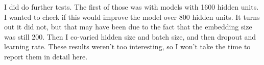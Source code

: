 \documentclass{article}
\begin{document}
I did do further tests. The first of those was with models with 1600 hidden units. I wanted to check if this would improve the model over 800 hidden units. It turns out it did not, but that may have been due to the fact that the embedding size was still 200. Then I co-varied hidden size and batch size, and then dropout and learning rate. These results weren't too interesting, so I won't take the time to report them in detail here. 

%
\end{document}
